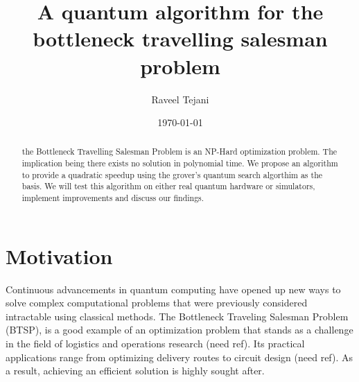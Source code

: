 \documentclass[twocolumn,showpacs,preprintnumbers,amsmath,amssymb]{revtex4}
\begin{document}
		
		\title{A quantum algorithm for the bottleneck travelling salesman problem}
		
		\author{Raveel Tejani}
		
		\date{\today}
		
		\begin{abstract}
			
			the Bottleneck Travelling Salesman Problem is an NP-Hard optimization problem. The implication being
			there exists no solution in polynomial time.  We propose an algorithm to provide a 
			quadratic speedup using the grover's quantum search algorthim as the basis. We will test this algorithm on either
			real quantum hardware or simulators, implement improvements and discuss our findings.
			
		\end{abstract}
		
		\maketitle
		
		
		\section{Motivation}
		
		
		Continuous advancements in quantum computing have opened up new ways to solve complex computational problems that were previously considered intractable using classical methods. The Bottleneck Traveling Salesman Problem (BTSP), is a good example of an optimization problem that stands as a challenge in the field of logistics and operations research (need ref). Its practical applications range from optimizing delivery routes to circuit design (need ref). As a result, achieving an efficient solution is highly sought after.
		
\end{document}
